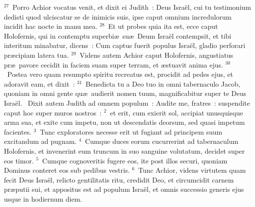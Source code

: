 ${}^{27}$~Porro Achior vocatus venit, et dixit ei Judith~: Deus Isra\"el, cui tu testimonium dedisti quod ulciscatur se de inimicis suis, ipse caput omnium incredulorum incidit hac nocte in manu mea.
${}^{28}$~Et ut probes quia ita est, ecce caput Holofernis, qui in contemptu superbi\ae\ su\ae\ Deum Isra\"el contempsit, et tibi interitum minabatur, dicens~: Cum captus fuerit populus Isra\"el, gladio perforari pr\ae cipiam latera tua.
${}^{29}$~Videns autem Achior caput Holofernis, angustiatus pr\ae\ pavore cecidit in faciem suam super terram, et \ae stuavit anima ejus.
${}^{30}$~Postea vero quam resumpto spiritu recreatus est, procidit ad pedes ejus, et adoravit eam, et dixit~:
${}^{31}$~Benedicta tu a Deo tuo in omni tabernaculo Jacob, quoniam in omni gente qu\ae\ audierit nomen tuum, magnificabitur super te Deus Isra\"el.
~Dixit autem Judith ad omnem populum~: Audite me, fratres~: suspendite caput hoc super muros nostros~:
${}^{2}$~et erit, cum exierit sol, accipiat unusquisque arma sua, et exite cum impetu, non ut descendatis deorsum, sed quasi impetum facientes.
${}^{3}$~Tunc exploratores necesse erit ut fugiant ad principem suum excitandum ad pugnam.
${}^{4}$~Cumque duces eorum cucurrerint ad tabernaculum Holofernis, et invenerint eum truncum in suo sanguine volutatum, decidet super eos timor.
${}^{5}$~Cumque cognoveritis fugere eos, ite post illos securi, quoniam Dominus conteret eos sub pedibus vestris.
${}^{6}$~Tunc Achior, videns virtutem quam fecit Deus Isra\"el, relicto gentilitatis ritu, credidit Deo, et circumcidit carnem pr\ae putii sui, et appositus est ad populum Isra\"el, et omnis successio generis ejus usque in hodiernum diem.


